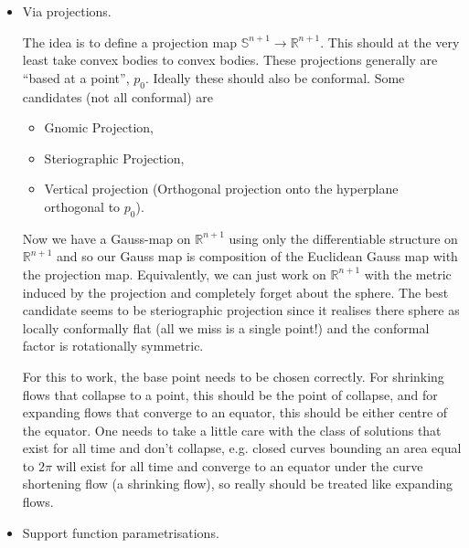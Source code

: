 \documentclass{amsart}
\begin{document}
\begin{itemize}
\item Via projections. 

The idea is to define a projection map $\mathbb{S}^{n+1} \to \mathbb{R}^{n+1}$. This should at the very least take convex bodies to convex bodies. These projections generally are ``based at a point'', $p_0$. Ideally these should also be conformal. Some candidates (not all conformal) are
\begin{itemize}
\item Gnomic Projection,
\item Steriographic Projection,
\item Vertical projection (Orthogonal projection onto the hyperplane orthogonal to $p_0$).
\end{itemize}
Now we have a Gauss-map on $\mathbb{R}^{n+1}$ using only the differentiable structure on $\mathbb{R}^{n+1}$ and so our Gauss map is composition of the Euclidean Gauss map with the projection map. Equivalently, we can just work on $\mathbb{R}^{n+1}$ with the metric induced by the projection and completely forget about the sphere. The best candidate seems to be steriographic projection since it realises there sphere as locally conformally flat (all we miss is a single point!) and the conformal factor is rotationally symmetric.

For this to work, the base point needs to be chosen correctly. For shrinking flows that collapse to a point, this should be the point of collapse, and for expanding flows that converge to an equator, this should be either centre of the equator. One needs to take a little care with the class of solutions that exist for all time and don't collapse, e.g. closed curves bounding an area equal to $2\pi$ will exist for all time and converge to an equator under the curve shortening flow (a shrinking flow), so really should be treated like expanding flows.

\item Support function parametrisations.


\end{itemize}
\end{document}
